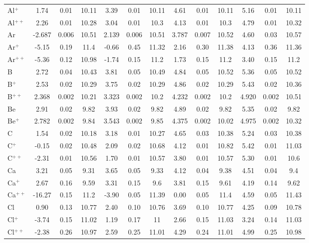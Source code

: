 \begin{longtable}{l!{\vrule width 0.25pt}ccc!{\vrule width 0.25pt}ccc!{\vrule width 0.25pt}ccc!{\vrule width 0.25pt}ccc}
Al$^+$ & 1.74 & 0.01 & 10.11 & 3.39 & 0.01 & 10.11 & 4.61 & 0.01 & 10.11 & 5.16 & 0.01 & 10.11 \\
Al$^{++}$ & 2.26 & 0.01 & 10.28 & 3.04 & 0.01 & 10.3 & 4.13 & 0.01 & 10.3 & 4.79 & 0.01 & 10.32 \\
Ar & -2.687 & 0.006 & 10.51 & 2.139 & 0.006 & 10.51 & 3.787 & 0.007 & 10.52 & 4.60 & 0.03 & 10.57 \\
Ar$^+$ & -5.15 & 0.19 & 11.4 & -0.66 & 0.45 & 11.32 & 2.16 & 0.30 & 11.38 & 4.13 & 0.36 & 11.36 \\
Ar$^{++}$ & -5.36 & 0.12 & 10.98 & -1.74 & 0.15 & 11.2 & 1.73 & 0.15 & 11.2 & 3.40 & 0.15 & 11.2 \\
B & 2.72 & 0.04 & 10.43 & 3.81 & 0.05 & 10.49 & 4.84 & 0.05 & 10.52 & 5.36 & 0.05 & 10.52 \\
B$^+$ & 2.53 & 0.02 & 10.29 & 3.75 & 0.02 & 10.29 & 4.86 & 0.02 & 10.29 & 5.43 & 0.02 & 10.36 \\
B$^{++}$ & 2.368 & 0.002 & 10.21 & 3.323 & 0.002 & 10.2 & 4.232 & 0.002 & 10.2 & 4.920 & 0.002 & 10.51 \\
Be & 2.91 & 0.02 & 9.82 & 3.93 & 0.02 & 9.82 & 4.89 & 0.02 & 9.82 & 5.35 & 0.02 & 9.82 \\
Be$^+$ & 2.782 & 0.002 & 9.84 & 3.543 & 0.002 & 9.85 & 4.375 & 0.002 & 10.02 & 4.975 & 0.002 & 10.32 \\
C & 1.54 & 0.02 & 10.18 & 3.18 & 0.01 & 10.27 & 4.65 & 0.03 & 10.38 & 5.24 & 0.03 & 10.38 \\
C$^+$ & -0.15 & 0.02 & 10.48 & 2.09 & 0.02 & 10.68 & 4.12 & 0.01 & 10.82 & 5.42 & 0.01 & 11.03 \\
C$^{++}$ & -2.31 & 0.01 & 10.56 & 1.70 & 0.01 & 10.57 & 3.80 & 0.01 & 10.57 & 5.30 & 0.01 & 10.6 \\
Ca & 3.21 & 0.05 & 9.31 & 3.65 & 0.05 & 9.33 & 4.12 & 0.04 & 9.38 & 4.51 & 0.04 & 9.4 \\
Ca$^+$ & 2.67 & 0.16 & 9.59 & 3.31 & 0.15 & 9.6 & 3.81 & 0.15 & 9.61 & 4.19 & 0.14 & 9.62 \\
Ca$^{++}$ & -16.27 & 0.15 & 11.2 & -3.90 & 0.05 & 11.39 & 0.00 & 0.05 & 11.4 & 4.59 & 0.05 & 11.43 \\
Cl & 0.90 & 0.13 & 10.77 & 2.40 & 0.10 & 10.76 & 3.69 & 0.10 & 10.77 & 4.25 & 0.09 & 10.78 \\
Cl$^+$ & -3.74 & 0.15 & 11.02 & 1.19 & 0.17 & 11 & 2.66 & 0.15 & 11.03 & 3.24 & 0.14 & 11.03 \\
Cl$^{++}$ & -2.38 & 0.26 & 10.97 & 2.59 & 0.25 & 11.01 & 4.29 & 0.24 & 11.01 & 4.99 & 0.25 & 10.98 \\

\end{longtable}
